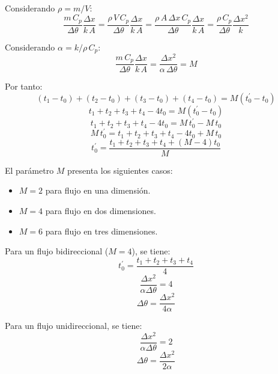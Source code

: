 Considerando $\rho=m/V$:
\begin{equation*}
    \frac{m\,C_p}{\Delta\theta}\frac{\Delta x}{k\,A}=
    \frac{\rho\,V\,C_p}{\Delta\theta}\frac{\Delta x}{k\,A}=
    \frac{\rho\,A\,\Delta x\,C_p}{\Delta\theta}\frac{\Delta x}{k\,A}=
    \frac{\rho\,C_p}{\Delta\theta}\frac{\Delta x^2}{k}
\end{equation*}

Considerando $\alpha=k/\rho\,C_p$:
\begin{equation*}
    \frac{m\,C_p}{\Delta\theta}\frac{\Delta x}{k\,A}=
    \frac{\Delta x^2}{\alpha\,\Delta\theta}=
    M
\end{equation*}

Por tanto:
\begin{equation*}
    (t_1-t_0)+
    (t_2-t_0)+
    (t_3-t_0)+
    (t_4-t_0)=
    M(t_0^{'}-t_0)
\end{equation*}
\begin{equation*}
    t_1+t_2+t_3+t_4-4t_0=M(t_0^{'}-t_0)
\end{equation*}
\begin{equation*}
    t_1+t_2+t_3+t_4-4t_0=M\,t_0^{'}-M\,t_0
\end{equation*}
\begin{equation*}
    M\,t_0^{'}=t_1+t_2+t_3+t_4-4t_0+M\,t_0
\end{equation*}
\begin{equation}
    t_0^{'}=\frac{t_1+t_2+t_3+t_4+(M-4)t_0}{M}
\end{equation}

El parámetro $M$ presenta los siguientes casos:
\begin{itemize}
    \item $M=2$ para flujo en una dimensión.
    \item $M=4$ para flujo en dos dimensiones.
    \item $M=6$ para flujo en tres dimensiones.
\end{itemize}

Para un flujo bidireccional ($M=4$), se tiene:
\begin{equation*}
    t_0^{'}=\frac{t_1+t_2+t_3+t_4}{4}
\end{equation*}
\begin{equation*}
    \frac{\Delta x^2}{\alpha\Delta\theta}=4
\end{equation*}
\begin{equation}
    \Delta\theta=\frac{\Delta x^2}{4\alpha}
\end{equation}

Para un flujo unidireccional, se tiene:
\begin{equation*}
    \frac{\Delta x^2}{\alpha\Delta\theta}=2
\end{equation*}
\begin{equation}
    \Delta\theta=\frac{\Delta x^2}{2\alpha}
\end{equation}

